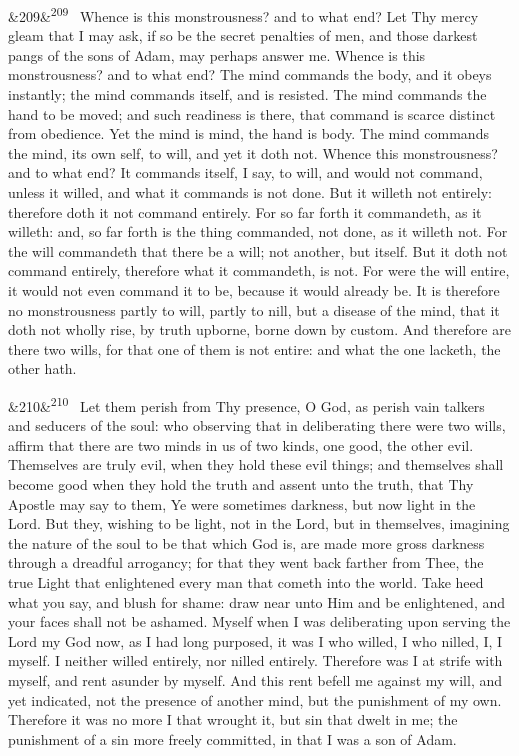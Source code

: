 \documentclass[12pt]{article}
\newcommand{\para}[1][]{\par\noindent\ifx&#1&\else\textsuperscript{\footnotesize #1}~\fi}
\begin{document}
\para[209] Whence is this monstrousness? and to what end? Let Thy mercy gleam that I may ask, if so be the secret penalties of men, and those darkest pangs of the sons of Adam, may perhaps answer me. Whence is this monstrousness? and to what end? The mind commands the body, and it obeys instantly; the mind commands itself, and is resisted. The mind commands the hand to be moved; and such readiness is there, that command is scarce distinct from obedience. Yet the mind is mind, the hand is body. The mind commands the mind, its own self, to will, and yet it doth not. Whence this monstrousness? and to what end? It commands itself, I say, to will, and would not command, unless it willed, and what it commands is not done. But it willeth not entirely: therefore doth it not command entirely. For so far forth it commandeth, as it willeth: and, so far forth is the thing commanded, not done, as it willeth not. For the will commandeth that there be a will; not another, but itself. But it doth not command entirely, therefore what it commandeth, is not. For were the will entire, it would not even command it to be, because it would already be. It is therefore no monstrousness partly to will, partly to nill, but a disease of the mind, that it doth not wholly rise, by truth upborne, borne down by custom. And therefore are there two wills, for that one of them is not entire: and what the one lacketh, the other hath.

\para[210] Let them perish from Thy presence, O God, as perish vain talkers and seducers of the soul: who observing that in deliberating there were two wills, affirm that there are two minds in us of two kinds, one good, the other evil. Themselves are truly evil, when they hold these evil things; and themselves shall become good when they hold the truth and assent unto the truth, that Thy Apostle may say to them, Ye were sometimes darkness, but now light in the Lord. But they, wishing to be light, not in the Lord, but in themselves, imagining the nature of the soul to be that which God is, are made more gross darkness through a dreadful arrogancy; for that they went back farther from Thee, the true Light that enlightened every man that cometh into the world. Take heed what you say, and blush for shame: draw near unto Him and be enlightened, and your faces shall not be ashamed. Myself when I was deliberating upon serving the Lord my God now, as I had long purposed, it was I who willed, I who nilled, I, I myself. I neither willed entirely, nor nilled entirely. Therefore was I at strife with myself, and rent asunder by myself. And this rent befell me against my will, and yet indicated, not the presence of another mind, but the punishment of my own. Therefore it was no more I that wrought it, but sin that dwelt in me; the punishment of a sin more freely committed, in that I was a son of Adam.
\end{document}
